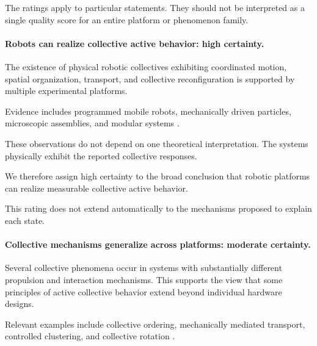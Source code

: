 The ratings apply to particular statements.
They should not be interpreted as a
single quality score for an entire
platform or phenomenon family.

\paragraph*{Robots can realize collective active behavior: high certainty.}

The existence of physical robotic collectives
exhibiting coordinated motion, spatial
organization, transport, and collective
reconfiguration is supported by
multiple experimental platforms.

Evidence includes programmed mobile robots,
mechanically driven particles,
microscopic assemblies, and
modular systems
\cite{Rubenstein2014programmableselfas,Vsrhelyi2018optimizedflockingo,Welch2018aggregatesuppressio,Li2019particleroboticsba,Yigit2019programmablecollect,Buerle2020formationofstable,Savoie2019arobotmadeofrobo,Xie2020bioinspiredsoftmic,Yang2022emergentmicroroboti,Xi2024emergentintelligenc,Wang2025hyperuniformnetwork}.

These observations do not depend
on one theoretical interpretation.
The systems physically exhibit
the reported collective responses.

We therefore assign high certainty
to the broad conclusion that
robotic platforms can realize
measurable collective active
behavior.

This rating does not extend
automatically to the mechanisms
proposed to explain each state.

\paragraph*{Collective mechanisms generalize across platforms:
moderate certainty.}

Several collective phenomena occur in
systems with substantially different
propulsion and interaction mechanisms.
This supports the view that some
principles of active collective
behavior extend beyond
individual hardware designs.

Relevant examples include
collective ordering,
mechanically mediated transport,
controlled clustering,
and collective rotation
\cite{Tarcai2011patternstransition,Scholz2018rotatingrobotsmove,Buerle2020formationofstable,Chvykov2020lowrattlingapred,Fruchart2022nonreciprocalphase,Chen2024persistentandrespo,Luo2025flockingphasesepar,Casiulis2025ageometricconditio}.

